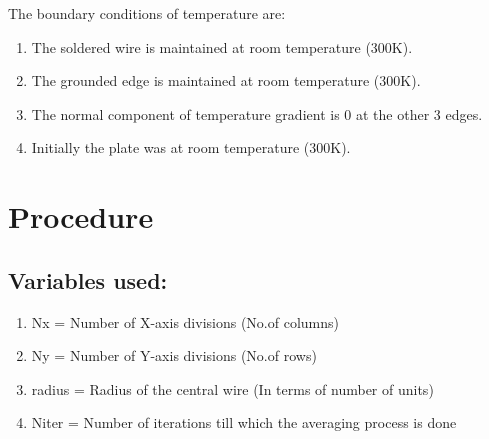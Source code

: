 \documentclass[12pt, a4paper]{article}
\begin{document}
The boundary conditions of temperature are:
\begin{enumerate}
    \item The soldered wire is maintained at room temperature (300K).
    \item The grounded edge is maintained at room temperature (300K).
    \item The normal component of temperature gradient is 0 at the other 3 edges. 
    \item Initially the plate was at room temperature (300K).
\end{enumerate}
\section{Procedure}
\subsection{Variables used:}
\begin{enumerate}
    \item Nx = Number of X-axis divisions (No.of columns)
    \item Ny = Number of Y-axis divisions (No.of rows)
    \item radius = Radius of the central wire (In terms of number of units)
    \item Niter = Number of iterations till which the averaging process is done
\end{enumerate}
\end{document}
